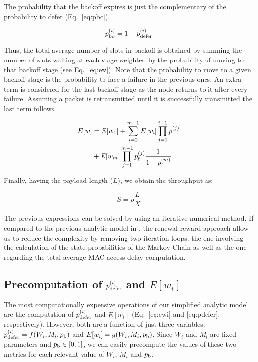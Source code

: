 \documentclass[preprint,12pt]{elsarticle}
\begin{document}
The probability that the backoff expires is just the complementary of the probability to defer (Eq.~\ref{eq:pbo}).

\begin{equation}\label{eq:pbo}
p_{\rm bo}^{(i)} = 1 - p_{\rm defer}^{(i)}
\end{equation}

Thus, the total average number of slots in backoff is obtained by summing the number of slots waiting at each stage weighted by the probability of moving to that backoff stage (see Eq.~\ref{eq:ew}). Note that the probability to move to a given backoff stage is the probability to face a failure in the previous ones. An extra term is considered for the last backoff stage as the node returns to it after every failure. Assuming a packet is retransmitted until it is successfully transmitted the last term follows.

\begin{equation}\label{eq:ew}
\begin{split}
 E[w] & = E[w_1] + \sum_{i=2}^{m-1} E[w_i] \prod_{j=1}^{i-1} p_{\rm f}^{(j)} \\
      & + E[w_m] \prod_{j=1}^{m-1} p_{\rm f}^{(j)} \frac{1}{1-p_{\rm f}^{(m)}}
\end{split}
\end{equation}

Finally, having the payload length ($L$), we obtain the throughput as:

\begin{equation}\label{eq:S}
S =  \rho \frac{L}{X}
\end{equation}

The previous expressions can be solved by using an iterative numerical method. If compared to the previous analytic model in \cite{chung2006performance}, the renewal reward approach allow us to reduce the complexity by removing two iteration loops: the one involving the calculation of the state probabilities of the Markov Chain as well as the one regarding the total average MAC access delay computation.

\subsection{Precomputation of $p_{\rm defer}^{(i)}$ and $E[w_i]$}



The most computationally expensive operations of our simplified analytic model are the computation of $p_{\rm defer}^{(i)}$ and $E[w_i]$ (Eq.~\ref{eq:ewi} and \ref{eq:pdefer}, respectively). However, both are a function of just three variables: $p_{\rm defer}^{(i)}=f(W_i, M_i,p_{\rm b})$ and $E[w_i]=g(W_i, M_i,p_{\rm b})$. Since $W_i$ and $M_i$ are fixed parameters and $p_{\rm b} \in [0,1]$, we can easily precompute the values of these two metrics for each relevant value of $W_i$, $M_i$ and $p_{\rm b}$.
\end{document}
